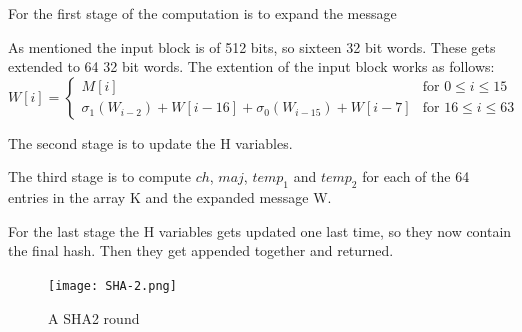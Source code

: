 \documentclass[a4paper]{article}
\begin{document}
\begin{enumerate}
For the first stage of the computation is to expand the message

As mentioned the input block is of 512 bits, so sixteen 32 bit words. These gets extended to 64 32 bit words.
The extention of the input block works as follows:
\begin{equation}
  W[i] =
  \begin{cases}
    M[i]  &\text{for } 0 \leq i \leq 15\\
    \sigma_1(W_{i-2}) + W[i-16] + \sigma_0(W_{i-15}) + W[i-7] &\text{for } 16 \leq i \leq 63
  \end{cases}
\end{equation}

The second stage is to update the H variables.

The third stage is to compute \(ch\), \(maj\), \(temp_1\) and \(temp_2\) for each of the 64 entries in the array K and the expanded message W.

For the last stage the H variables gets updated one last time, so they now contain the final hash. Then they get appended together and returned.

\begin{figure}[H]
\centering
\texttt{[image: SHA-2.png]}
\caption{A SHA2 round}
\label{fig:SHA2Round}
\end{figure}

\end{enumerate}
\end{document}
